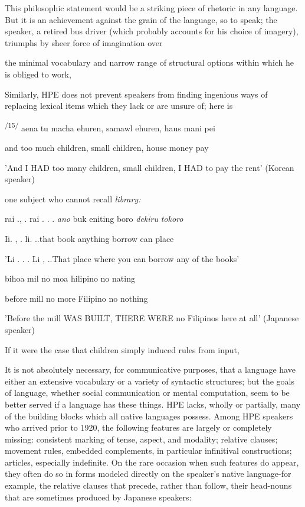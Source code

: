 This philosophic statement would be a striking piece of rhetoric in any language. But it is an achievement against the grain of the language, so to speak; the speaker, a retired bus driver (which probably accounts for his choice of imagery), triumphs by sheer force of imagination over


the minimal vocabulary and narrow range of structural options within which he is obliged to work,

Similarly, HPE does not prevent speakers from finding ingenious ways of replacing lexical items which they lack or are unsure of; here is


\textsuperscript{/15/} aena tu macha ehuren, samawl ehuren, haus mani pei

and too much children, small children, house money pay

'And I HAD too many children, small children, I HAD to pay the rent' (Korean speaker)

one subject who cannot recall \textit{library:}

\ea\label{ex:13}
rai ., . rai . . . \textit{ano} buk eniting boro \textit{dekiru} \textit{tokoro}
\glt
\z

Ii. , . li. ..that book anything borrow can place

'Li . . . Li , ..That place where you can borrow any of the books'

\ea\label{ex:16}

\glt
\z

bihoa mil no moa hilipino no nating

before mill no more Filipino no nothing

'Before the mill WAS BUILT, THERE WERE no Filipinos here at all' (Japanese speaker)

If it were the case that children simply induced rules from input,

It is not absolutely necessary, for communicative purposes, that a language have either an extensive vocabulary or a variety of syntactic structures; but the goals of language, whether social communication or mental computation, seem to be better served if a language has these things. HPE lacks, wholly or partially, many of the building blocks which all native languages possess. Among HPE speakers who arrived prior to 1920, the following features are largely or completely missing: consistent marking of tense, aspect, and modality; relative clauses; movement rules, embedded complements, in particular infinitival con\-structions; articles, especially indefinite. On the rare occasion when such features do appear, they often do so in forms modeled directly on the speaker's native language{}-for example, the relative clauses that precede, rather than follow, their head-nouns that are sometimes produced by Japanese speakers:

